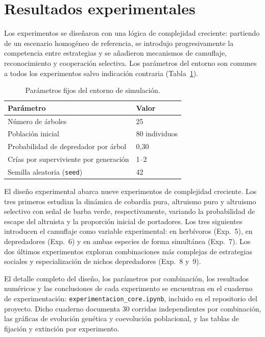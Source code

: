 \documentclass[11pt,a4paper]{article}
\begin{document}
\section{Resultados experimentales}

Los experimentos se dise\~naron con una l\'ogica de complejidad creciente: partiendo de un escenario homog\'eneo de referencia,
se introdujo progresivamente la competencia entre estrategias y se a\~nadieron mecanismos de camuflaje, reconocimiento y cooperaci\'on selectiva.
Los par\'ametros del entorno son comunes a todos los experimentos salvo indicaci\'on contraria (Tabla~\ref{tab:params}).

\begin{table}[H]
\centering
\caption{Par\'ametros fijos del entorno de simulaci\'on.}
\label{tab:params}
\begin{tabular}{ll}
\toprule
Par\'ametro & Valor \\
\midrule
N\'umero de \'arboles                          & 25 \\
Poblaci\'on inicial                            & 80 individuos \\
Probabilidad de depredador por \'arbol        & 0{,}30 \\
Cr\'ias por superviviente por generaci\'on    & 1--2 \\
Semilla aleatoria (\texttt{seed})              & 42 \\
\bottomrule
\end{tabular}
\end{table}

El dise\~no experimental abarca nueve experimentos de complejidad creciente.
Los tres primeros estudian la din\'amica de cobard\'ia pura, altruismo puro y altruismo selectivo con se\~nal de barba verde,
respectivamente, variando la probabilidad de escape del altruista y la proporci\'on inicial de portadores.
Los tres siguientes introducen el camuflaje como variable experimental: en herbívoros (Exp.~5),
en depredadores (Exp.~6) y en ambas especies de forma simult\'anea (Exp.~7).
Los dos \'ultimos experimentos exploran combinaciones m\'as complejas de estrategias sociales
y especializaci\'on de nichos depredadores (Exp.~8 y~9).

El detalle completo del dise\~no, los par\'ametros por combinaci\'on, los resultados num\'ericos y las
conclusiones de cada experimento se encuentran en el cuaderno de experimentaci\'on:
\texttt{experimentacion\_core.ipynb}, incluido en el repositorio del proyecto.
Dicho cuaderno documenta 30 corridas independientes por combinaci\'on, las gr\'aficas de evoluci\'on
gen\'etica y coevolución poblacional, y las tablas de fijaci\'on y extinción por experimento.
\end{document}
